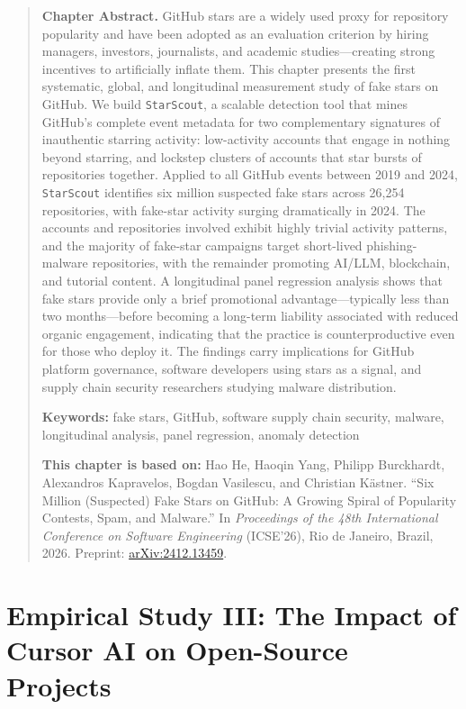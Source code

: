 \documentclass[12pt, openany]{cmuthesis}
\newcommand{\SystemName}[0]{\texttt{StarScout}\xspace}
\newcommand{\chapterfrontmatter}[3]{%
    \vspace{1em}%
    \begingroup
    \begin{quote}
    \noindent\textbf{Chapter Abstract.} #1\par
    \vspace{0.8em}%
    \noindent\textbf{Keywords:} #2\par
    \vspace{0.8em}%
    \noindent\textbf{This chapter is based on:} #3\par
    \end{quote}
    \endgroup
    \vspace{1em}%
}
\begin{document}
\chapterfrontmatter{%
GitHub stars are a widely used proxy for repository popularity and have been adopted as an evaluation criterion by hiring managers, investors, journalists, and academic studies---creating strong incentives to artificially inflate them.
This chapter presents the first systematic, global, and longitudinal measurement study of fake stars on GitHub.
We build \SystemName, a scalable detection tool that mines GitHub's complete event metadata for two complementary signatures of inauthentic starring activity: low-activity accounts that engage in nothing beyond starring, and lockstep clusters of accounts that star bursts of repositories together.
Applied to all GitHub events between 2019 and 2024, \SystemName identifies six million suspected fake stars across 26{,}254 repositories, with fake-star activity surging dramatically in 2024.
The accounts and repositories involved exhibit highly trivial activity patterns, and the majority of fake-star campaigns target short-lived phishing-malware repositories, with the remainder promoting AI/LLM, blockchain, and tutorial content.
A longitudinal panel regression analysis shows that fake stars provide only a brief promotional advantage---typically less than two months---before becoming a long-term liability associated with reduced organic engagement, indicating that the practice is counterproductive even for those who deploy it.
The findings carry implications for GitHub platform governance, software developers using stars as a signal, and supply chain security researchers studying malware distribution.%
}{%
fake stars, GitHub, software supply chain security, malware, longitudinal analysis, panel regression, anomaly detection%
}{%
Hao He, Haoqin Yang, Philipp Burckhardt, Alexandros Kapravelos, Bogdan Vasilescu, and Christian K\"astner.
``Six Million (Suspected) Fake Stars on GitHub: A Growing Spiral of Popularity Contests, Spam, and Malware.''
In \emph{Proceedings of the 48th International Conference on Software Engineering} (ICSE'26), Rio de Janeiro, Brazil, 2026.
Preprint: \href{https://arxiv.org/abs/2412.13459}{arXiv:2412.13459}.%
}



\chapter{Empirical Study III: The Impact of Cursor AI on Open-Source Projects}
\label{chp:cursor}
\end{document}
